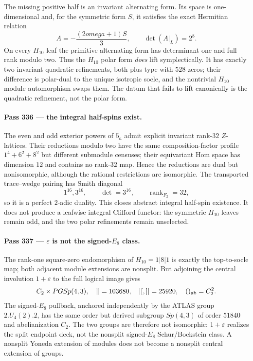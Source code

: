 \documentclass[12pt,a4paper]{article}
\def\mathbb#1{#1}%
\def\mathrm#1{#1}%
\def\omega{omega}%
\def\cdot{ }%
\theoremstyle{definition}
\newcommand{\Sp}{\mathrm{Sp}}
\newcommand{\PGSp}{\mathrm{PGSp}}
\newcommand{\FF}{\mathbb{F}}
\newcommand{\ZZ}{\mathbb{Z}}
\begin{document}
The missing positive half is an invariant alternating form.  Its space is
one-dimensional and, for the symmetric form $S$, it satisfies the exact
Hermitian relation
\[
 A=-\frac{(2\omega+1)S}{3},\qquad \det(A|_L)=2^8.
\]
On every $H_{10}$ leaf the primitive alternating form has determinant one and
full rank modulo two.  Thus the $H_{10}$ polar form \emph{does} lift
symplectically.  It has exactly two invariant quadratic refinements, both plus
type with $528$ zeros; their difference is polar-dual to the unique isotropic
socle, and the nontrivial $H_{10}$ module automorphism swaps them.  The datum
that fails to lift canonically is the quadratic refinement, not the polar form.

\paragraph{Pass 336 --- the integral half-spins exist.}
The even and odd exterior powers of $5_a$ admit explicit invariant rank-$32$
$\ZZ$-lattices.  Their reductions modulo two have the same composition-factor
profile $1^4+6^2+8^2$ but different submodule censuses; their equivariant Hom
space has dimension $12$ and contains no rank-$32$ map.  Hence the reductions
are dual but nonisomorphic, although the rational restrictions are isomorphic.
The transported trace--wedge pairing has Smith diagonal
\[
 1^{16},3^{16},\qquad \det=3^{16},\qquad \operatorname{rank}_{\FF_2}=32,
\]
so it is a perfect $2$-adic duality.  This closes abstract integral half-spin
existence.  It does not produce a leafwise integral Clifford functor: the
symmetric $H_{10}$ leaves remain odd, and the two polar refinements remain
unselected.

\paragraph{Pass 337 --- $\varepsilon$ is not the signed-$E_8$ class.}
The rank-one square-zero endomorphism of $H_{10}=1|8|1$ is exactly the
top-to-socle map; both adjacent module extensions are nonsplit.  But adjoining
the central involution $1+\varepsilon$ to the full logical image gives
\[
 C_2\times\PGSp(4,3),\quad |\cdot|=103680,\quad
 |[\cdot,\cdot]|=25920,\quad (\cdot)_{\rm ab}=C_2^2.
\]
The signed-$E_8$ pullback, anchored independently by the ATLAS group
$2.U_4(2).2$, has the same order but derived subgroup $\Sp(4,3)$ of order
$51840$ and abelianization $C_2$.  The two groups are therefore not isomorphic:
$1+\varepsilon$ realizes the split endpoint deck, not the nonsplit
signed-$E_8$ Schur/Bockstein class.  A nonsplit Yoneda extension of modules does
not become a nonsplit central extension of groups.
\end{document}
